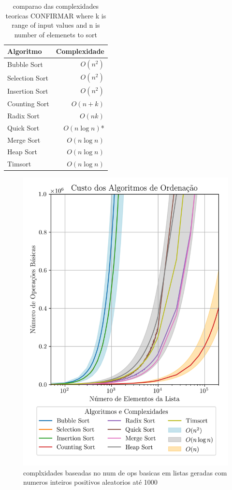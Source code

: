 \documentclass[conference]{IEEEtran}
\begin{document}
\begin{table}[H]
\centering
\caption{comparao das complexidades teoricas CONFIRMAR where k is  range of input values and n is number of elemenets to sort}
\label{tab:complexidades}
\begin{tabular}{lr}
\toprule
\textbf{Algoritmo} & \textbf{Complexidade} \\
\midrule
Bubble Sort & $O(n^2)$ \\
Selection Sort & $O(n^2)$ \\
Insertion Sort & $O(n^2)$ \\
Counting Sort & $O(n + k)$ \\
Radix Sort & $O(nk)$ \\
Quick Sort & $O(n \log n)$* \\
Merge Sort & $O(n \log n)$ \\
Heap Sort & $O(n \log n)$ \\
Timsort & $O(n \log n)$ \\
\bottomrule
\end{tabular}
\end{table}

\begin{figure}[H]
    \centering
    \includegraphics[width=1\linewidth]{sorting_complexities.png}
    \caption{complxidades baseadas no num de ops basicas em listas geradas com numeros inteiros positivos aleatorios até 1000}
    \label{fig:sorting_complexities}
\end{figure}





\end{document}
